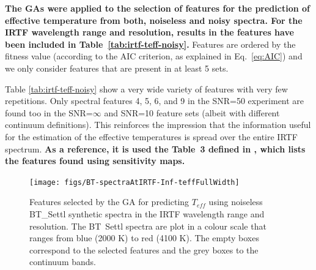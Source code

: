 \textbf{
The GAs were applied to the selection of features for the
prediction of effective temperature from both, noiseless and noisy spectra.
For the IRTF wavelength range and resolution, results in the features have been included
in Table~\ref{tab:irtf-teff-noisy}. 
}
Features are ordered by the
fitness value (according to the AIC criterion, as explained in Eq.~\ref{eq:AIC}) and 
we only consider features that are present in at least 5 sets.


Table %
\ref{tab:irtf-teff-noisy}
show a very wide variety of features with very few repetitions. Only
spectral features 4, 5, 6, and 9 in the SNR=50 experiment are found
too in the SNR=$\infty$ and SNR=10 feature sets (albeit with different
continuum definitions). This reinforces the impression that the
information useful for the estimation of the effective temperatures is
spread over the entire IRTF spectrum.
\textbf{
As a reference, it is used the Table~3 defined in \cite{cesetti}, which
lists the features found using sensitivity maps.
}


\begin{figure}
 \captionsetup[subfloat]{farskip=2pt,captionskip=-18pt}
 \vspace*{-10pt}
\texttt{[image: figs/BT-spectraAtIRTF-Inf-teffFullWidth]}
 \caption{Features selected by the GA for predicting $T_{eff}$ using
    noiseless BT\_Settl synthetic spectra in the IRTF wavelength range
    and resolution. The BT\ Settl spectra are plot in a colour scale
    that ranges from blue (2000 K) to red (4100 K). The empty boxes
    correspond to the selected features and the grey boxes to the
    continuum bands.}  \label{fig:IRTF-teff}
\end{figure}

%


